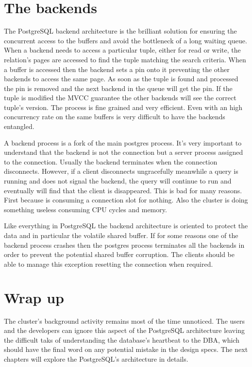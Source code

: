 \section{The backends}
\label{sec:CLUBACKEND}
The PostgreSQL backend architecture is the brilliant solution for ensuring the concurrent access to the 
buffers and avoid the bottleneck of a long waiting queue. When a backend needs to access a particular tuple, 
either for read or write, the relation's pages are accessed to find the tuple matching the search criteria. 
When a buffer is accessed then the backend sets a pin onto it preventing the other backends to access the 
same page. As soon as the tuple is found and processed the pin is removed and the next backend in the queue 
will get the pin. If the tuple is modified the MVCC guarantee the other backends will see the correct 
tuple's version. The process is fine grained and very efficient. Even with an high concurrency rate on the 
same buffers is very difficult to have the backends entangled.\newline

A backend process is a fork of the main postgres process. It's very important to understand that the 
backend is not the connection but a server process assigned to the connection. Usually the backend 
terminates when the connection disconnects. However, if a client disconnects ungracefully meanwhile a query 
is running and does not signal the backend, the query will continue to run and eventually will find 
that the client is disappeared.  This is bad for many reasons. First because is consuming 
a connection slot for nothing. Also the cluster is doing something useless consuming CPU cycles and memory. 
\newline

Like everything in PostgreSQL the backend architecture is oriented to protect the data and in particular 
the volatile shared buffer. If for some reasons one of the backend process crashes then the postgres 
process terminates all the backends in order to prevent the potential shared buffer corruption. The clients 
should be able to manage this exception resetting the connection when required.\newline

\section{Wrap up}
The cluster's background activity remains most of the time unnoticed. The users and the developers can 
ignore this aspect of the PostgreSQL architecture leaving the difficult taks of understanding the 
database's heartbeat to the DBA, which should have the final word on any potential mistake in the design 
specs. The next chapters will explore the PostgreSQL's architecture in details.

